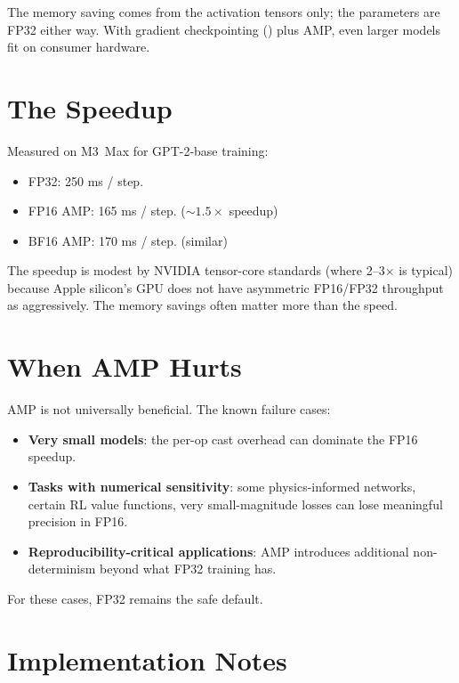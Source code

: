 The memory saving comes from the activation tensors only; the
parameters are FP32 either way. With gradient checkpointing
() plus AMP, even larger models
fit on consumer hardware.

\section{The Speedup}
\label{sec:amp:speedup}

Measured on M3~Max for GPT-2-base training:

\begin{itemize}
  \item FP32: 250 ms / step.
  \item FP16 AMP: 165 ms / step. ($\sim 1.5\times$ speedup)
  \item BF16 AMP: 170 ms / step. (similar)
\end{itemize}

The speedup is modest by NVIDIA tensor-core standards (where
2--3$\times$ is typical) because Apple silicon's GPU does not
have asymmetric FP16/FP32 throughput as aggressively. The
memory savings often matter more than the speed.

\section{When AMP Hurts}
\label{sec:amp:hurts}

AMP is not universally beneficial. The known failure cases:

\begin{itemize}
  \item \textbf{Very small models}: the per-op cast overhead can
    dominate the FP16 speedup.
  \item \textbf{Tasks with numerical sensitivity}: some
    physics-informed networks, certain RL value functions, very
    small-magnitude losses can lose meaningful precision in FP16.
  \item \textbf{Reproducibility-critical applications}: AMP
    introduces additional non-determinism beyond what FP32
    training has.
\end{itemize}

For these cases, FP32 remains the safe default.

\section{Implementation Notes}
\label{sec:amp:impl}


